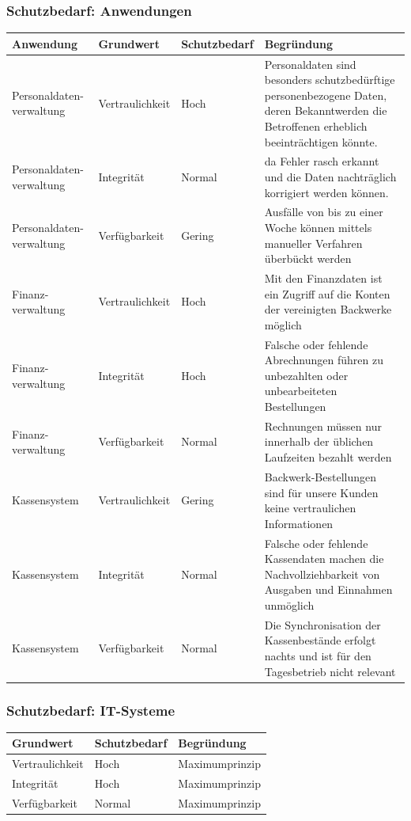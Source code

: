 \subsubsection{Schutzbedarf: Anwendungen}
\begin{minipage}{\textwidth}
\begin{center}
\begin{tabular}{p{3.5cm}llp{6.3cm}}
\toprule
Anwendung & Grundwert & Schutzbedarf & Begründung \\
\midrule
Personaldaten-verwaltung & Vertraulichkeit & Hoch & Personaldaten sind besonders schutzbedürftige personenbezogene Daten, deren Bekanntwerden die Betroffenen erheblich beeinträchtigen könnte. \\
Personaldaten-verwaltung & Integrität & Normal & da Fehler rasch erkannt und die Daten nachträglich korrigiert werden können. \\
Personaldaten-verwaltung & Verfügbarkeit & Gering & Ausfälle von bis zu einer Woche können mittels manueller Verfahren überbückt werden \\
Finanz-verwaltung & Vertraulichkeit & Hoch & Mit den Finanzdaten ist ein Zugriff auf die Konten der vereinigten Backwerke möglich \\
Finanz-verwaltung & Integrität & Hoch & Falsche oder fehlende Abrechnungen führen zu unbezahlten oder unbearbeiteten Bestellungen \\
Finanz-verwaltung & Verfügbarkeit & Normal & Rechnungen müssen nur innerhalb der üblichen Laufzeiten bezahlt werden \\
Kassensystem & Vertraulichkeit & Gering & Backwerk-Bestellungen sind für unsere Kunden keine vertraulichen Informationen \\
Kassensystem & Integrität & Normal & Falsche oder fehlende Kassendaten machen die Nachvollziehbarkeit von Ausgaben und Einnahmen unmöglich \\
Kassensystem & Verfügbarkeit & Normal & Die Synchronisation der Kassenbestände erfolgt nachts und ist für den Tagesbetrieb nicht relevant\\
\bottomrule
\end{tabular}
\end{center}
\end{minipage}

\subsubsection{Schutzbedarf: IT-Systeme}
\begin{minipage}{\textwidth}
\begin{center}
\begin{tabular}{lll}
\toprule
Grundwert & Schutzbedarf & Begründung \\
\midrule
Vertraulichkeit & Hoch & Maximumprinzip \\
Integrität & Hoch & Maximumprinzip \\
Verfügbarkeit & Normal & Maximumprinzip \\
\bottomrule
\end{tabular}
\end{center}
\end{minipage}

